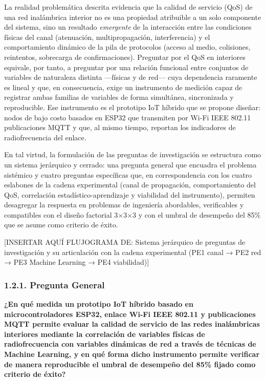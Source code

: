 \documentclass[
  12pt,
]{article}
\begin{document}
La realidad problemática descrita evidencia que la calidad de servicio
(QoS) de una red inalámbrica interior no es una propiedad atribuible a
un solo componente del sistema, sino un resultado \emph{emergente} de la
interacción entre las condiciones físicas del canal (atenuación,
multipropagación, interferencia) y el comportamiento dinámico de la pila
de protocolos (acceso al medio, colisiones, reintentos, sobrecarga de
confirmaciones). Preguntar por el QoS en interiores equivale, por tanto,
a preguntar por una relación funcional entre conjuntos de variables de
naturaleza distinta —físicas y de red— cuya dependencia raramente es
lineal y que, en consecuencia, exige un instrumento de medición capaz de
registrar ambas familias de variables de forma simultánea, sincronizada
y reproducible. Ese instrumento es el prototipo IoT híbrido que se
propone diseñar: nodos de bajo costo basados en ESP32 que transmiten por
Wi-Fi IEEE 802.11 publicaciones MQTT y que, al mismo tiempo, reportan
los indicadores de radiofrecuencia del enlace.

En tal virtud, la formulación de las preguntas de investigación se
estructura como un sistema jerárquico y cerrado: una pregunta general
que encuadra el problema sistémico y cuatro preguntas específicas que,
en correspondencia con los cuatro eslabones de la cadena experimental
(canal de propagación, comportamiento del QoS, correlación
estadístico-aprendizaje y viabilidad del instrumento), permiten
desagregar la respuesta en problemas de ingeniería abordables,
verificables y compatibles con el diseño factorial 3×3×3 y con el umbral
de desempeño del 85\% que se asume como criterio de éxito.

{[}INSERTAR AQUÍ FLUJOGRAMA DE: Sistema jerárquico de preguntas de
investigación y su articulación con la cadena experimental (PE1 canal →
PE2 red → PE3 Machine Learning → PE4 viabilidad){]}

\subsubsection{1.2.1. Pregunta General}\label{pregunta-general}

\textbf{¿En qué medida un prototipo IoT híbrido basado en
microcontroladores ESP32, enlace Wi-Fi IEEE 802.11 y publicaciones MQTT
permite evaluar la calidad de servicio de las redes inalámbricas
interiores mediante la correlación de variables físicas de
radiofrecuencia con variables dinámicas de red a través de técnicas de
Machine Learning, y en qué forma dicho instrumento permite verificar de
manera reproducible el umbral de desempeño del 85\% fijado como criterio
de éxito?}
\end{document}
